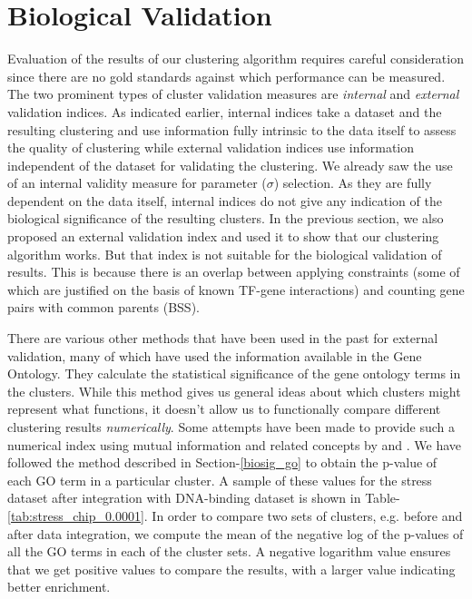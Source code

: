 \section{Biological Validation}

Evaluation of the results of our clustering algorithm requires careful consideration since there are no gold standards against which performance can be measured. The two prominent types of cluster validation measures are \textit{internal} and \textit{external} validation indices. As indicated earlier, internal indices take a dataset and the resulting clustering and use information fully intrinsic to the data itself to assess the quality of clustering while external validation indices use information independent of the dataset for validating the clustering. We already saw the use of an internal validity measure for parameter ($\sigma$) selection. As they are fully dependent on the data itself, internal indices do not give any indication of the biological significance of the resulting clusters. In the previous section, we also proposed an external validation index and used it to show that our clustering algorithm works. But that index is not suitable for the biological validation of results. This is because there is an overlap between applying constraints (some of which are justified on the basis of known TF-gene interactions) and counting gene pairs with common parents (BSS).  

There are various other methods that have been used in the past for external validation, many of which have used the information available in the Gene Ontology. They calculate the statistical significance of the gene ontology terms in the clusters. While this method gives us general ideas about which clusters might represent what functions, it doesn't allow us to functionally compare different clustering results \textit{numerically}. Some attempts have been made to provide such a numerical index using mutual information and related concepts by \citet{Gibons2002Judging} and \citet{gatviks03scoring}. We have followed the method described in Section-\ref{biosig_go} to obtain the p-value of each GO term in a particular cluster. A sample of these values for the stress dataset after integration with DNA-binding dataset is shown in Table-\ref{tab:stress_chip_0.0001}. In order to compare two sets of clusters, e.g. before and after data integration, we compute the mean of the negative log of the p-values of all the GO terms in each of the cluster sets. A negative logarithm value ensures that we get positive values to compare the results, with a larger value indicating better enrichment.

